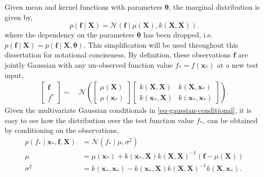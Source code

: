 \documentclass{mimosis-class/mimosis}
\numberwithin{equation}{chapter}
\newcommand{\f}{\ensuremath{\mathbf{f}}}
\begin{document}
Given mean and kernel functions with parameters \(\bm\theta\), the marginal distribution is given by,
\begin{equation} \label{eq-gp-prior}
p(\mathbf{f} \mid \mathbf{X}) = \mathcal{N}(\mathbf{f} \mid \mu(\mathbf{X}), k(\mathbf{X}, \mathbf{X})).
\end{equation}
where the dependency on the parameters \(\bm\theta\) has been dropped, i.e.
\(p(\f \mid \mathbf{X}) = p(\f \mid \mathbf{X}, \bm\theta)\).
This simplification will be used throughout this dissertation for notational conciseness.
By definition, these observations \(\mathbf{f}\) are jointly Gaussian with any un-observed function value
\(f_* = f(\mathbf{x}_*)\) at a new test input,
\begin{align*} \label{eq-gp-joint}
\left[\begin{array}{c}
      \mathbf{f} \\
      f^{*}
\end{array}\right]
\sim\ &\mathcal{N}\left(
\left[\begin{array}{c}
      \mu(\mathbf{X}) \\
      \mu(\mathbf{x}_{*})
 \end{array}\right]
\left[\begin{array}{cc}
      k(\mathbf{X}, \mathbf{X}) & k(\mathbf{X},\mathbf{x}_{*}) \\
      k(\mathbf{x}_{*},\mathbf{X}) & k(\mathbf{x}_{*},\mathbf{x}_{*})
 \end{array}\right]\right).
\end{align*}
Given the multivariate Gaussian conditionals in \cref{eq-gaussian-conditional}, it is easy to see how
the distribution over the test function value \(f_*\),
can be obtained by conditioning on the observations,
\begin{align} \label{eq-gp-prediction}
p(f_{*} \mid \mathbf{x}_*, \mathbf{f}, \mathbf{X}) &= \mathcal{N}(f_* \mid \mu, \sigma^2)  \\
\mu &= \mu(\mathbf{x}_*) + k(\mathbf{x}_*, \mathbf{X}) k(\mathbf{X}, \mathbf{X})^{-1} (\mathbf{f} - \mu(\mathbf{X})) \nonumber\\
\sigma^2 &= k(\mathbf{x}_*, \mathbf{x}_*) - k(\mathbf{x}_*, \mathbf{X}) k(\mathbf{X}, \mathbf{X})^{-1} k(\mathbf{X}, \mathbf{x}_*). \nonumber
\end{align}
\end{document}
